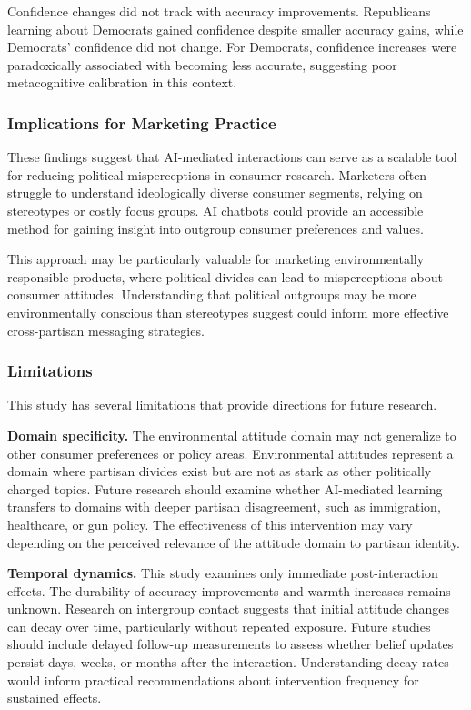 \documentclass[
  11pt,
  oneside]{article}
\begin{document}
Confidence changes did not track with accuracy improvements. Republicans
learning about Democrats gained confidence despite smaller accuracy
gains, while Democrats' confidence did not change. For Democrats,
confidence increases were paradoxically associated with becoming less
accurate, suggesting poor metacognitive calibration in this context.

\subsubsection{Implications for Marketing
Practice}\label{implications-for-marketing-practice}

These findings suggest that AI-mediated interactions can serve as a
scalable tool for reducing political misperceptions in consumer
research. Marketers often struggle to understand ideologically diverse
consumer segments, relying on stereotypes or costly focus groups. AI
chatbots could provide an accessible method for gaining insight into
outgroup consumer preferences and values.

This approach may be particularly valuable for marketing environmentally
responsible products, where political divides can lead to misperceptions
about consumer attitudes. Understanding that political outgroups may be
more environmentally conscious than stereotypes suggest could inform
more effective cross-partisan messaging strategies.

\subsubsection{Limitations}\label{limitations}

This study has several limitations that provide directions for future
research.

\textbf{Domain specificity.} The environmental attitude domain may not
generalize to other consumer preferences or policy areas. Environmental
attitudes represent a domain where partisan divides exist but are not as
stark as other politically charged topics. Future research should
examine whether AI-mediated learning transfers to domains with deeper
partisan disagreement, such as immigration, healthcare, or gun policy.
The effectiveness of this intervention may vary depending on the
perceived relevance of the attitude domain to partisan identity.

\textbf{Temporal dynamics.} This study examines only immediate
post-interaction effects. The durability of accuracy improvements and
warmth increases remains unknown. Research on intergroup contact
suggests that initial attitude changes can decay over time, particularly
without repeated exposure. Future studies should include delayed
follow-up measurements to assess whether belief updates persist days,
weeks, or months after the interaction. Understanding decay rates would
inform practical recommendations about intervention frequency for
sustained effects.
\end{document}
